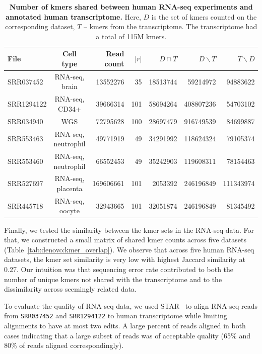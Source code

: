 \documentclass[12pt]{cmuthesis}
\begin{document}
    \begin{table}
      \centering
      \begin{tabular}{l c r r r r r}
          \toprule
          File  & Cell type & Read count & $|r|$ & $D \cap T$ & $D \backslash T$ & $T \backslash D$ \\
          \midrule
          SRR037452 & RNA-seq, brain & 13552276 & 35 & 18513744 & 59214972 & 94883622 \\
          SRR1294122  & RNA-seq, CD34+ & 39666314 & 101 & 58694264 & 408807236 & 54703102 \\
          SRR034940 & WGS & 72795628 & 100 & 28697479 & 916749539 & 84699887 \\
          SRR553463 & RNA-seq, neutrophil & 49771919 & 49 & 34291992 & 118624324 & 79105374 \\
          SRR553460 & RNA-seq, neutrophil & 66552453 & 49 & 35242903 & 119608311 & 78154463 \\
          SRR527697 & RNA-seq, placenta & 169606661 & 101 & 2053392 & 246196849 & 111343974 \\
          SRR445718 & RNA-seq, oocyte & 32943665& 101 & 32051874 & 246196849 & 81345492 \\
          \bottomrule
      \end{tabular}
      \caption{\textbf{Number of kmers shared between human RNA-seq experiments and annotated human transcriptome.} Here, $D$ is the set of kmers counted on the corresponding dataset, $T$ -- kmers from the transcriptome. The transcriptome had a total of 115M kmers.}
      \label{tab:denovo:transciptome_overlap}
    \end{table}

    Finally, we tested the similarity between the kmer sets in the RNA-seq data. For that, we constructed a small matrix of shared kmer counts across five datasets (Table~\ref{tab:denovo:kmer_overlap}). We observe that across five human RNA-seq datasets, the kmer set similarity is very low with highest Jaccard similarity at 0.27. Our intuition was that sequencing error rate contributed to both the number of unique kmers not shared with the transcriptome and to the dissimilarity across seemingly related data. 


    To evaluate the quality of RNA-seq data, we used STAR~\cite{DobinSTAR} to align RNA-seq reads from \texttt{SRR037452} and \texttt{SRR1294122} to human transcriptome while limiting alignments to have at most two edits. A large percent of reads aligned in both cases indicating that a large subset of reads was of acceptable quality (65\% and 80\% of reads aligned correspondingly).
\end{document}
